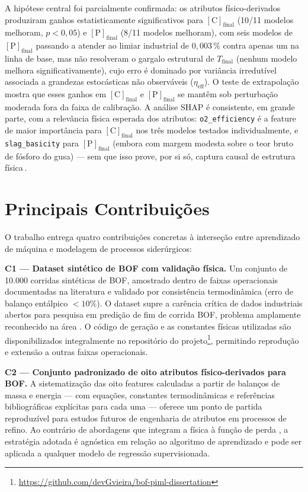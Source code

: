 A hipótese central foi parcialmente confirmada: os atributos físico-derivados produziram ganhos estatisticamente significativos para $[\text{C}]_\text{final}$ (10/11 modelos melhoram, $p < 0{,}05$) e $[\text{P}]_\text{final}$ (8/11 modelos melhoram), com seis modelos de $[\text{P}]_\text{final}$ passando a atender ao limiar industrial de $0{,}003\,\%$ contra apenas um na linha de base, mas não resolveram o gargalo estrutural de $T_\text{final}$ (nenhum modelo melhora significativamente), cujo erro é dominado por variância irredutível associada a grandezas estocásticas não observáveis ($\eta_\text{eff}$). O teste de extrapolação mostra que esses ganhos em $[\text{C}]_\text{final}$ e $[\text{P}]_\text{final}$ se mantêm sob perturbação moderada fora da faixa de calibração. A análise SHAP é consistente, em grande parte, com a relevância física esperada dos atributos: \texttt{o2\_efficiency} é a feature de maior importância para $[\text{C}]_\text{final}$ nos três modelos testados individualmente, e \texttt{slag\_basicity} para $[\text{P}]_\text{final}$ (embora com margem modesta sobre o teor bruto de fósforo do gusa) --- sem que isso prove, por si só, captura causal de estrutura física\,\cite{manojlovic2022eaf,xia2024dmpinn}.


\section{Principais Contribuições}
\label{sec:contribuicoes}

O trabalho entrega quatro contribuições concretas à interseção entre aprendizado de máquina e modelagem de processos siderúrgicos:

\textbf{C1 — Dataset sintético de BOF com validação física.} Um conjunto de 10.000 corridas sintéticas de BOF, amostrado dentro de faixas operacionais documentadas na literatura \cite{chattopadhyay2022hybrid,bae2020bof} e validado por consistência termodinâmica (erro de balanço entálpico $< 10\%$). O dataset supre a carência crítica de dados industriais abertos para pesquisa em predição de fim de corrida BOF, problema amplamente reconhecido na área \cite{ghalati2023review,zhou2024bof}. O código de geração e as constantes físicas utilizadas são disponibilizados integralmente no repositório do projeto\footnote{\url{https://github.com/devGvieira/bof-piml-dissertation}}, permitindo reprodução e extensão a outras faixas operacionais.

\textbf{C2 — Conjunto padronizado de oito atributos físico-derivados para BOF.} A sistematização das oito features calculadas a partir de balanços de massa e energia --- com equações, constantes termodinâmicas e referências bibliográficas explícitas para cada uma --- oferece um ponto de partida reproduzível para estudos futuros de engenharia de atributos em processos de refino. Ao contrário de abordagens que integram a física à função de perda \cite{raissi2019pinns,xia2024dmpinn}, a estratégia adotada é agnóstica em relação ao algoritmo de aprendizado e pode ser aplicada a qualquer modelo de regressão supervisionada.

